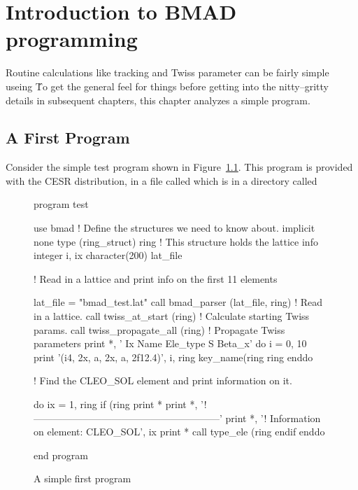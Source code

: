 \chapter{Introduction to BMAD programming}
\label{c:program_info}

Routine calculations like tracking and Twiss parameter can be fairly
simple useing \bmad\. To get the general feel for things before
getting into the nitty--gritty details in subsequent chapters, this
chapter analyzes a simple program.

\section{A First Program}

Consider the simple test program shown in Figure~\ref{f:program}.
This program is provided with the CESR distribution, in a file called
 which is in a directory called 

\begin{figure}
\begin{listing}{1}
program test

  use bmad                 ! Define the structures we need to know about.
  implicit none
  type (ring_struct) ring  ! This structure holds the lattice info
  integer i, ix
  character(200) lat_file

! Read in a lattice and print info on the first 11 elements

  lat_file = "bmad_test.lat"
  call bmad_parser (lat_file, ring)    ! Read in a lattice.
  call twiss_at_start (ring)           ! Calculate starting Twiss params.
  call twiss_propagate_all (ring)      ! Propagate Twiss parameters
  print *, ' Ix  Name              Ele_type                   S      Beta_x'
  do i = 0, 10
    print '(i4, 2x, a, 2x, a, 2f12.4)', i, ring%
                    key_name(ring%
                    ring%
  enddo

! Find the CLEO_SOL element and print information on it.

  do ix = 1, ring%
    if (ring%
      print *
      print *, '!---------------------------------------------------------'
      print *, '! Information on element: CLEO_SOL', ix
      print *
      call type_ele (ring%
    endif
  enddo

end program
\end{listing}
\caption{A simple first program}
\label{f:program}
\end{figure}

